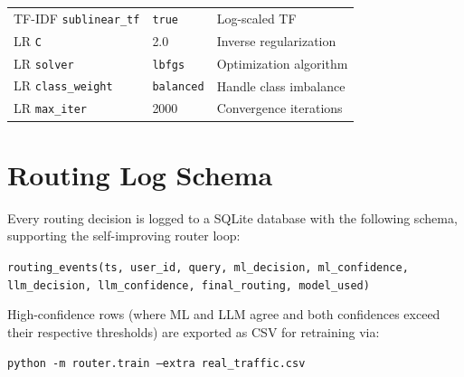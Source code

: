 \documentclass{article}
\begin{document}
\begin{table}[h]
\begin{tabular}{lll}
TF-IDF \texttt{sublinear\_tf}            & \texttt{true}           & Log-scaled TF \\
LR \texttt{C}                            & 2.0                     & Inverse regularization \\
LR \texttt{solver}                       & \texttt{lbfgs}          & Optimization algorithm \\
LR \texttt{class\_weight}                & \texttt{balanced}       & Handle class imbalance \\
LR \texttt{max\_iter}                    & 2000                    & Convergence iterations \\
\bottomrule
\end{tabular}
\end{table}

\section{Routing Log Schema}
\label{app:schema}

Every routing decision is logged to a SQLite database with the following
schema, supporting the self-improving router loop:
\begin{center}
\small
\texttt{routing\_events(ts, user\_id, query, ml\_decision, ml\_confidence,}\\
\texttt{llm\_decision, llm\_confidence, final\_routing, model\_used)}
\end{center}
High-confidence rows (where ML and LLM agree and both confidences exceed
their respective thresholds) are exported as CSV for retraining via:
\begin{center}
\small
\texttt{python -m router.train --extra real\_traffic.csv}
\end{center}

\newpage

\end{document}
